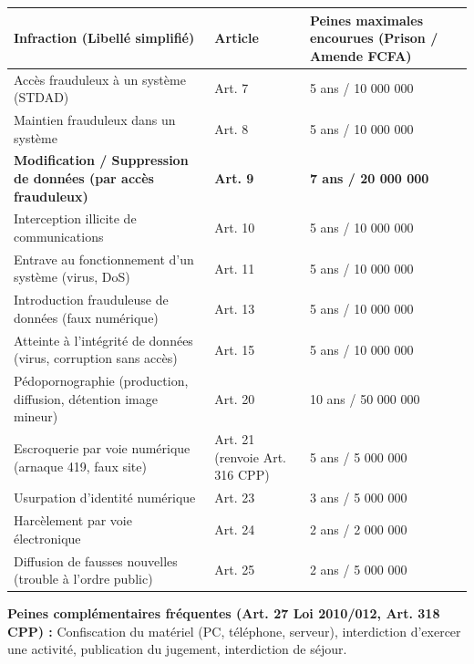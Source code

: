 \documentclass[11pt]{article}
\begin{document}
\begin{propriete}
    \begin{center}
    \begin{tabularx}{\linewidth}{|l|l|X|}
    \hline
    \rowcolor{popblueL}
    \textbf{Infraction (Libellé simplifié)} & \textbf{Article} & \textbf{Peines maximales encourues (Prison / Amende FCFA)} \\
    \hline
    Accès frauduleux à un système (STDAD) & Art. 7 & 5 ans / 10 000 000 \\
    Maintien frauduleux dans un système & Art. 8 & 5 ans / 10 000 000 \\
    \textbf{Modification / Suppression de données (par accès frauduleux)} & \textbf{Art. 9} & \textbf{7 ans / 20 000 000} \\
    Interception illicite de communications & Art. 10 & 5 ans / 10 000 000 \\
    Entrave au fonctionnement d'un système (virus, DoS) & Art. 11 & 5 ans / 10 000 000 \\
    Introduction frauduleuse de données (faux numérique) & Art. 13 & 5 ans / 10 000 000 \\
    \hline
    Atteinte à l'intégrité de données (virus, corruption sans accès) & Art. 15 & 5 ans / 10 000 000 \\
    \hline
    Pédopornographie (production, diffusion, détention image mineur) & Art. 20 & 10 ans / 50 000 000 \\
    Escroquerie par voie numérique (arnaque 419, faux site) & Art. 21 (renvoie Art. 316 CPP) & 5 ans / 5 000 000 \\
    Usurpation d'identité numérique & Art. 23 & 3 ans / 5 000 000 \\
    Harcèlement par voie électronique & Art. 24 & 2 ans / 2 000 000 \\
    Diffusion de fausses nouvelles (trouble à l'ordre public) & Art. 25 & 2 ans / 5 000 000 \\
    \hline
    \end{tabularx}
    \end{center}
    \textbf{Peines complémentaires fréquentes (Art. 27 Loi 2010/012, Art. 318 CPP) :} Confiscation du matériel (PC, téléphone, serveur), interdiction d'exercer une activité, publication du jugement, interdiction de séjour.
\end{propriete}
\end{document}
